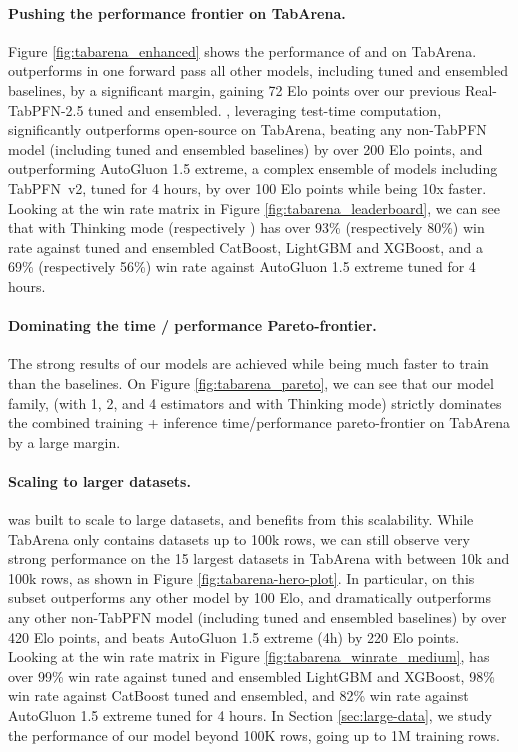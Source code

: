 \paragraph{Pushing the performance frontier on TabArena.}
Figure \ref{fig:tabarena_enhanced} shows the performance of \ourmodel and \ourmodelenhanced on TabArena.
\ourmodel outperforms in one forward pass all other models, including tuned and ensembled baselines, by a significant margin, gaining 72 Elo points over our previous Real-TabPFN-2.5 tuned and ensembled.
\ourmodelenhanced, leveraging test-time computation, significantly outperforms open-source \ourmodel on TabArena, beating any non-TabPFN model (including tuned and ensembled baselines) by over 200 Elo points,
and outperforming AutoGluon 1.5 extreme, a complex ensemble of models including TabPFN~v2, tuned for 4 hours, by over 100 Elo points while being 10x faster.
Looking at the win rate matrix in Figure \ref{fig:tabarena_leaderboard}, we can see that \ourmodelplus with Thinking mode (respectively \ourmodel) has over 93\% (respectively 80\%) win rate against tuned and ensembled CatBoost, LightGBM and XGBoost, and a 69\% (respectively 56\%) win rate against AutoGluon 1.5 extreme tuned for 4 hours.

\paragraph{Dominating the time / performance Pareto-frontier.}
The strong results of our models are achieved while being much faster to train than the baselines.
On Figure \ref{fig:tabarena_pareto}, we can see that our model family, (\ourmodel with 1, 2, and 4 estimators and \ourmodelplus with Thinking mode) strictly dominates the combined training + inference time/performance pareto-frontier on TabArena by a large margin.


\paragraph{Scaling to larger datasets.}
\ourmodel was built to scale to large datasets, and \ourmodelenhanced benefits from this scalability. While TabArena only contains datasets up to 100k rows, we can still observe very strong performance on the 15 largest datasets in TabArena with between 10k and 100k rows, as shown in Figure \ref{fig:tabarena-hero-plot}.
In particular, on this subset \ourmodel outperforms any other model by 100 Elo, and \ourmodelenhanced dramatically outperforms any other non-TabPFN model (including tuned and ensembled baselines) by over 420 Elo points, and beats AutoGluon 1.5 extreme (4h) by 220 Elo points.
Looking at the win rate matrix in Figure \ref{fig:tabarena_winrate_medium}, \ourmodelenhanced has over 99\% win rate against tuned and ensembled LightGBM and XGBoost, 98\% win rate against CatBoost tuned and ensembled, and 82\% win rate against AutoGluon 1.5 extreme tuned for 4 hours. In Section \ref{sec:large-data}, we study the performance of our model beyond 100K rows, going up to 1M training rows.

